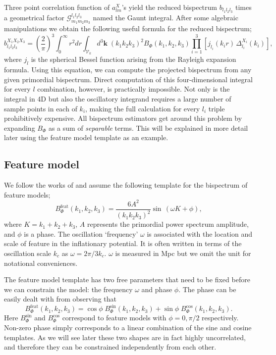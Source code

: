 Three point correlation function of $a_{lm}^X$'s yield the reduced bispectrum $b_{l_1 l_2 l_3}$ times a geometrical factor $\mathcal{G}^{l_1 l_2 l_3}_{m_1 m_2 m_3}$ named the Gaunt integral. After some algebraic manipulations we obtain the following useful formula for the reduced bispectrum;
\begin{equation}
	b_{l_1 l_2 l_3}^{X_1 X_2 X_3} = \left(\frac{2}{\pi}\right)^3 \int_{0}^{\infty} r^2 dr \int_{\mathcal{V}_k} d^3\textbf{k} \; (k_1 k_2 k_3)^2 B_\Phi (k_1, k_2, k_3) \prod_{i=1}^{3} \left[ j_{l_i}(k_i r) \, \Delta_{l_i}^{X_i}(k_i) \right],
	\label{reduced bispectrum}
\end{equation}
where $j_l$ is the spherical Bessel function arising from the Rayleigh expansion formula. Using this equation, we can compute the projected bispectrum from any given primordial bispectrum. Direct computation of this four-dimensional integral for every $l$ combination, however, is practically impossible. Not only is the integral in 4D but also the oscillatory integrand requires a large number of sample points in each of $k_i$, making the full calculation for every $l_i$ triple prohibitively expensive. All bispectrum estimators get around this problem by expanding $B_\Phi$ as a sum of \textit{separable} terms. This will be explained in more detail later using the feature model template as an example.

\subsection{Feature model}

We follow the works of \cite{Munchmeyer2014,Fergusson2015a,Fergusson2015b,PlanckCollaboration2015} and assume the following template for the bispectrum of feature models;
\begin{equation}
	B_\Phi ^ {\text{feat}}(k_1, k_2, k_3) = \frac{6 A^2}{(k_1 k_2 k_3)^2} \sin\,(\omega K + \phi),
	\label{feature model definition}
\end{equation}
where $K = k_1 + k_2 + k_3$, $A$ represents the primordial power spectrum amplitude, and $\phi$ is a phase. The oscillation `frequency' $\omega$ is associated with the location and scale of feature in the inflationary potential. It is often written in terms of the oscillation scale $k_c$ as $\omega = 2\pi/3k_c$. $\omega$ is measured in Mpc but we omit the unit for notational conveniences.

The feature model template has two free parameters that need to be fixed before we can constrain the model: the frequency $\omega$ and phase $\phi$. The phase can be easily dealt with from observing that
\begin{equation}
	B_\Phi^\text{feat}(k_1, k_2, k_3) = \cos\phi \; B_\Phi^\text{sin} (k_1, k_2, k_3) + \sin\phi \; B_\Phi^\text{cos} (k_1, k_2, k_3).
	\label{feature model bispectrum as a sum of sin and cos}
\end{equation}
Here $B_\Phi^\text{sin}$ and $B_\Phi^\text{cos}$ correspond to feature models with $\phi = 0, \pi/2$ respectively. Non-zero phase simply corresponds to a linear combination of the sine and cosine templates. As we will see later these two shapes are in fact highly uncorrelated, and therefore they can be constrained independently from each other.


